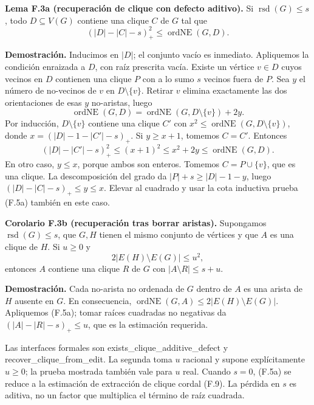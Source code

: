 \documentclass[spanish,11pt,a4paper]{article}
\begin{document}
\textbf{Lema F.3a (recuperación de clique con defecto aditivo).} Si \(\operatorname{rsd}(G)\le s\), todo \(D\subseteq V(G)\) contiene una clique \(C\) de \(G\) tal que \[
(|D|-|C|-s)_+^2\le\operatorname{ordNE}(G,D).
\tag{F.5a}
\]

\textbf{Demostración.} Inducimos en \(|D|\); el conjunto vacío es inmediato. Apliquemos la condición enraizada a \(D\), con raíz prescrita vacía. Existe un vértice \(v\in D\) cuyos vecinos en \(D\) contienen una clique \(P\) con a lo sumo \(s\) vecinos fuera de \(P\). Sea \(y\) el número de no-vecinos de \(v\) en \(D\setminus\{v\}\). Retirar \(v\) elimina exactamente las dos orientaciones de esas \(y\) no-aristas, luego \[
\operatorname{ordNE}(G,D)
=\operatorname{ordNE}(G,D\setminus\{v\})+2y.
\] Por inducción, \(D\setminus\{v\}\) contiene una clique \(C'\) con \(x^2\le\operatorname{ordNE}(G,D\setminus\{v\})\), donde \(x=(|D|-1-|C'|-s)_+\). Si \(y\ge x+1\), tomemos \(C=C'\). Entonces \[
(|D|-|C'|-s)_+^2\le(x+1)^2
\le x^2+2y\le\operatorname{ordNE}(G,D).
\] En otro caso, \(y\le x\), porque ambos son enteros. Tomemos \(C=P\cup\{v\}\), que es una clique. La descomposición del grado da \(|P|+s\ge |D|-1-y\), luego \((|D|-|C|-s)_+\le y\le x\). Elevar al cuadrado y usar la cota inductiva prueba (F.5a) también en este caso.

\textbf{Corolario F.3b (recuperación tras borrar aristas).} Supongamos \(\operatorname{rsd}(G)\le s\), que \(G,H\) tienen el mismo conjunto de vértices y que \(A\) es una clique de \(H\). Si \(u\ge0\) y \[
2|E(H)\setminus E(G)|\le u^2,
\] entonces \(A\) contiene una clique \(R\) de \(G\) con \(|A\setminus R|\le s+u\).

\textbf{Demostración.} Cada no-arista no ordenada de \(G\) dentro de \(A\) es una arista de \(H\) ausente en \(G\). En consecuencia, \(\operatorname{ordNE}(G,A)\le2|E(H)\setminus E(G)|\). Apliquemos (F.5a); tomar raíces cuadradas no negativas da \((|A|-|R|-s)_+\le u\), que es la estimación requerida.

Las interfaces formales son {\ttfamily\small exists\_\discretionary{\hbox{\ensuremath{\hookrightarrow}}}{}{}clique\_\discretionary{\hbox{\ensuremath{\hookrightarrow}}}{}{}additive\_\discretionary{\hbox{\ensuremath{\hookrightarrow}}}{}{}defect} y {\ttfamily\small recover\_\discretionary{\hbox{\ensuremath{\hookrightarrow}}}{}{}clique\_\discretionary{\hbox{\ensuremath{\hookrightarrow}}}{}{}from\_\discretionary{\hbox{\ensuremath{\hookrightarrow}}}{}{}edit}. La segunda toma \(u\) racional y supone explícitamente \(u\ge0\); la prueba mostrada también vale para \(u\) real. Cuando \(s=0\), (F.5a) se reduce a la estimación de extracción de clique cordal (F.9). La pérdida en \(s\) es aditiva, no un factor que multiplica el término de raíz cuadrada.
\end{document}
